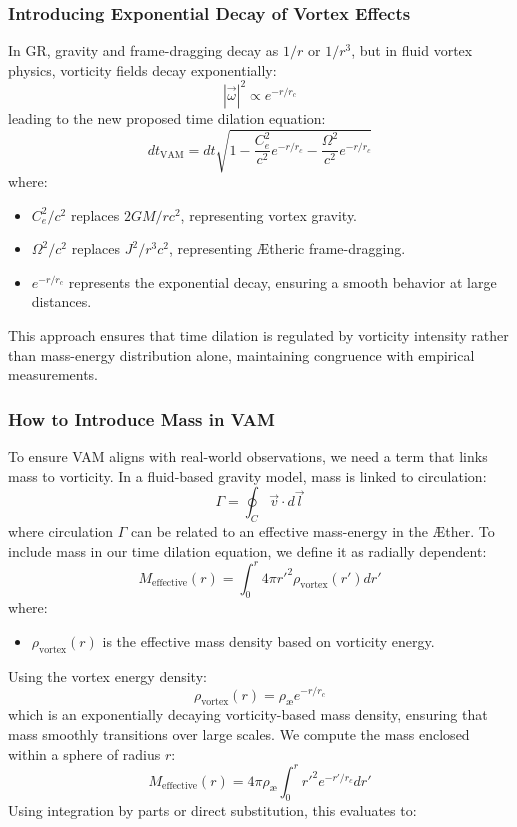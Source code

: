 \subsubsection*{Introducing Exponential Decay of Vortex Effects}
In GR, gravity and frame-dragging decay as $1/r$ or $1/r^3$, but in fluid vortex physics, vorticity fields decay exponentially:
\begin{equation*}
    |\vec{\omega}|^2 \propto e^{-r/r_c}
\end{equation*}
leading to the new proposed time dilation equation:
\begin{equation*}
    dt_{\text{VAM}} = dt \sqrt{1 - \frac{C_e^2}{c^2} e^{-r/r_c} - \frac{\Omega^2}{c^2} e^{-r/r_c}}
\end{equation*}
where:
\begin{itemize}
    \item $C_e^2/c^2$ replaces $2GM/r c^2$, representing vortex gravity.
    \item $\Omega^2/c^2$ replaces $J^2/r^3 c^2$, representing Ætheric frame-dragging.
    \item $e^{-r/r_c}$ represents the exponential decay, ensuring a smooth behavior at large distances.
\end{itemize}
This approach ensures that time dilation is regulated by vorticity intensity rather than mass-energy distribution alone, maintaining congruence with empirical measurements.

\subsubsection*{How to Introduce Mass in VAM}
To ensure VAM aligns with real-world observations, we need a term that links mass to vorticity. In a fluid-based gravity model, mass is linked to circulation:
\begin{equation*}
    \Gamma = \oint_C \vec{v} \cdot d\vec{l}
\end{equation*}
where circulation $\Gamma$ can be related to an effective mass-energy in the Æther. To include mass in our time dilation equation, we define it as radially dependent:
\begin{equation*}
    M_{\text{effective}}(r) = \int_0^r 4\pi r'^2 \rho_{\text{vortex}}(r') dr'
\end{equation*}
where:
\begin{itemize}
    \item $\rho_{\text{vortex}}(r)$ is the effective mass density based on vorticity energy.
\end{itemize}
Using the vortex energy density:
\begin{equation*}
    \rho_{\text{vortex}}(r) = \rho_\text{\ae} e^{-r / r_c}
\end{equation*}
which is an exponentially decaying vorticity-based mass density, ensuring that mass smoothly transitions over large scales. We compute the mass enclosed within a sphere of radius $r$:
\begin{equation*}
    M_{\text{effective}}(r) = 4\pi \rho_\text{\ae} \int_0^r r'^2 e^{-r' / r_c} dr'
\end{equation*}
Using integration by parts or direct substitution, this evaluates to:

